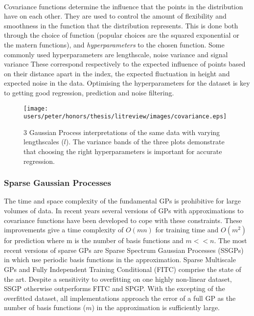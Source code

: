 	\paragraph{}
	Covariance functions determine the influence that the points in the distribution have on each other. They are used to control the amount of flexibility and smoothness in the function that the distribution represents. This is done both through the choice of function (popular choices are the squared exponential or the matern functions), and \emph{hyperparameters} to the chosen function. Some commonly used hyperparameters are lengthscale, noise variance and signal variance These correspond respectively to the expected influence of points based on their distance apart in the index, the expected fluctuation in height and expected noise in the data. Optimising the hyperparameters for the dataset is key to getting good regression, prediction and noise filtering.

	\begin{figure}[ht!]
	\centering
	\texttt{[image: users/peter/honors/thesis/litreview/images/covariance.eps]}
	\caption{3 Gaussian Process interpretations of the same data with varying lengthscales ($l$). The variance bands of the three plots demonstrate that choosing the right hyperparameters is important for accurate regression.}
	\label{gaussianprocesshyperparameters}
	\end{figure}
	

	
	\subsubsection{Sparse Gaussian Processes}
	The time and space complexity of the fundamental GPs is prohibitive for large volumes of data. In recent years several versions of GPs with approximations to covariance functions have been developed to cope with these constraints. These improvements give a time complexity of $O(mn)$ for training time and $O(m^{2})$ for prediction where m is the number of basis functions and $m << n$. The most recent versions of sparse GPs are Sparse Spectrum Gaussian Processes (SSGPs) in \citep{rasmussen2010ssgpr} which use periodic basis functions in the approximation. Sparse Multiscale GPs \citep{walder2008sparse} and Fully Independent Training Conditional (FITC) \citep{snelson2005sgppi} comprise the state of the art. Despite a sensitivity to overfitting on one highly non-linear dataset, SSGP otherwise outperforms FITC and SPGP. With the excepting of the overfitted dataset, all implementations approach the error of a full GP as the number of basis functions ($m$) in the approximation is sufficiently large.

